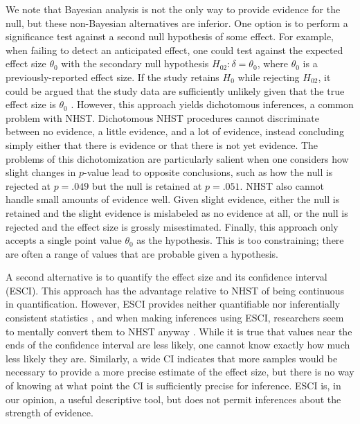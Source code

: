 \documentclass[man]{apa6}
\begin{document}
We note that Bayesian analysis is not the only way to provide evidence for the null, but these non-Bayesian alternatives are inferior. One option is to perform a significance test against a second null hypothesis of some effect. For example, when failing to detect an anticipated effect, one could test against the expected effect size $\theta_0$ with the secondary null hypothesis $H_{02}: \delta = \theta_0$, where $\theta_0$ is a previously-reported effect size. If the study retains $H_0$ while rejecting $H_{02}$, it could be argued that the study data are sufficiently unlikely given that the true effect size is $\theta_0$ \citep[e.g.,][]{Simonsohn:etal:2014}. 
However, this approach yields dichotomous inferences, a common problem with NHST. Dichotomous NHST procedures cannot discriminate between no evidence, a little evidence, and a lot of evidence, instead concluding simply either that there is evidence or that there is not yet evidence. The problems of this dichotomization are particularly salient when one considers how slight changes in $p$-value lead to opposite conclusions, such as how the null is rejected at $p = .049$ but the null is retained at $p = .051$. NHST also cannot handle small amounts of evidence well. Given slight evidence, either the null is retained and the slight evidence is mislabeled as no evidence at all, or the null is rejected and the effect size is grossly misestimated. Finally, this approach only accepts a single point value $\theta_0$ as the hypothesis. This is too constraining; there are often a range of values that are probable given a hypothesis.

A second alternative is to quantify the effect size and its confidence interval (ESCI). This approach has the advantage relative to NHST of being continuous in quantification.  However, ESCI provides neither quantifiable nor inferentially consistent statistics \citep[see][]{Morey:etal:2014}, and when making inferences using ESCI, researchers seem to mentally convert them to NHST anyway \citep{Hoekstra:etal:2014}. While it is true that values near the ends of the confidence interval are less likely, one cannot know exactly how much less likely they are. Similarly, a wide CI indicates that more samples would be necessary to provide a more precise estimate of the effect size, but there is no way of knowing at what point the CI is sufficiently precise for inference. ESCI is, in our opinion, a useful descriptive tool, but does not permit inferences about the strength of evidence.
\end{document}
